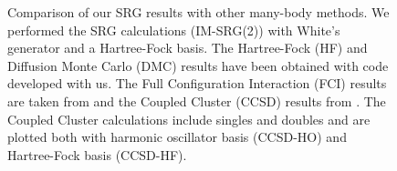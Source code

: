 \begin{figure}
\begin{center}
\end{center}
\caption{Comparison of our SRG results with other many-body methods. We performed the SRG calculations (IM-SRG(2)) with White's generator and a Hartree-Fock basis. The Hartree-Fock (HF) and Diffusion Monte Carlo (DMC) results have been obtained with code developed with us. The Full Configuration Interaction (FCI) results are taken from \cite{Frank} and the Coupled Cluster (CCSD) results from \cite{Christoffer}. The Coupled Cluster calculations include singles and doubles and are plotted both with harmonic oscillator basis (CCSD-HO) and Hartree-Fock basis (CCSD-HF). }
\label{fig:compall0}
\end{figure}

\begin{figure}
\begin{center}
\mbox{
}

\end{center}
\end{figure}
